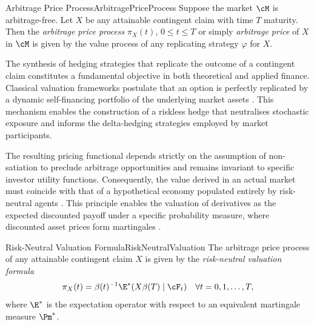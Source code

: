 \begin{defn}{Arbitrage Price Process}{ArbitragePriceProcess}
	Suppose the market $\cM$ is arbitrage-free. Let $X$ be any attainable contingent claim with time $T$ maturity. Then the \textit{arbitrage price process} $\pi_X(t)$, $0 \leq t \leq T$ or simply \textit{arbitrage price} of $X$ in $\cM$ is given by the value process of any replicating strategy $\varphi$ for $X$.
\end{defn}

The synthesis of hedging strategies that replicate the outcome of a contingent claim constitutes a fundamental objective in both theoretical and applied finance. Classical valuation frameworks postulate that an option is perfectly replicated by a dynamic self-financing portfolio of the underlying market assets \citep{black_pricing_1973, merton_pricing_1974}. This mechanism enables the construction of a riskless hedge that neutralises stochastic exposure and informs the delta-hedging strategies employed by market participants.

The resulting pricing functional depends strictly on the assumption of non-satiation to preclude arbitrage opportunities and remains invariant to specific investor utility functions. Consequently, the value derived in an actual market must coincide with that of a hypothetical economy populated entirely by risk-neutral agents \citep{cox_valuation_1976}. This principle enables the valuation of derivatives as the expected discounted payoff under a specific probability measure, where discounted asset prices form martingales \citep{harrison_martingales_1981}.

\begin{prop}{Risk-Neutral Valuation Formula}{RiskNeutralValuation}
	The arbitrage price process of any attainable contingent claim $X$ is given by the \textit{risk-neutral valuation formula}
	\begin{equation}
		\pi_X(t) = \beta(t)^{-1} \E^* (X \beta(T) \mid \cF_t) \quad \forall t = 0, 1, \dots, T,
		\label{eq:risk_neutral_formula}
	\end{equation}
	where $\E^*$ is the expectation operator with respect to an equivalent martingale measure $\Pm^*$.
\end{prop}

